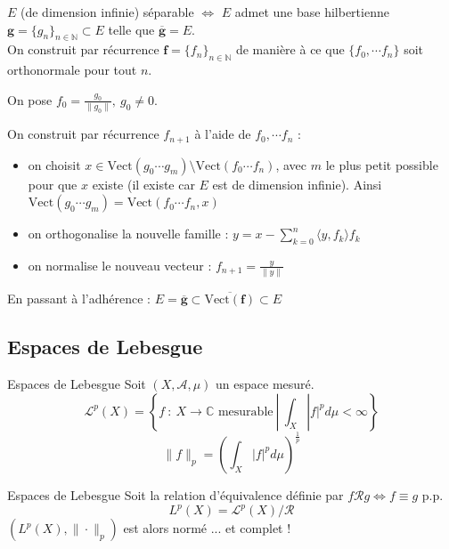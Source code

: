 \documentclass[french]{beamer}
\begin{document}
\begin{frame}{$E$ (de dimension infinie) séparable $\Longleftrightarrow$ $E$ admet une base hilbertienne}
	$\mathbf{g} = \{g_n\}_{n \in \mathbb{N}} \subset E$ telle que $\overline{\mathbf{g}} = E$.\\
	\pause
	On construit par récurrence $\mathbf{f} = \{f_n\}_{n \in \mathbb{N}}$ de manière à ce que $\{f_0, \cdots f_n\}$ soit orthonormale pour tout $n$. \\
	\pause
	
	On pose $f_0 = \frac{g_0}{\|g_0\|}, ~ g_0 \neq 0$.
	
	\pause
	On construit par récurrence $f_{n+1}$ à l'aide de $f_0, \cdots f_n$ :
	\pause
	\begin{itemize}
		\item on choisit $x \in \text{Vect} (g_0 \cdots g_m)  \setminus \text{Vect} (f_0 \cdots f_n)$, avec $m$ le plus petit possible pour que $x$ existe \pause (il existe car $E$ est de dimension infinie). \pause Ainsi $\text{Vect} (g_0 \cdots g_m) = \text{Vect} (f_0 \cdots f_n, x)$
		\pause
		\item on orthogonalise la nouvelle famille : $\displaystyle y = x - \sum_{k = 0}^{n} \langle y, f_k \rangle f_k$
		\pause
		\item on normalise le nouveau vecteur : $f_{n+1} = \frac{y}{\|y\|}$
	\end{itemize}
	
	\pause
	En passant à l'adhérence : $E = \overline{\mathbf{g}} \subset \overline{\text{Vect}(\mathbf{f})} \subset E$
\end{frame}

\subsection{Espaces de Lebesgue}

\begin{frame}{Espaces de Lebesgue}
	Soit $(X, \mathcal{A}, \mu)$ un espace mesuré.\\
	\pause
	$$\mathcal{L}^p(X) = \left\{f ~: ~ X \to \mathbb{C} \text{ mesurable} ~ | ~ \int_X |f|^p d\mu < \infty \right\}$$
	\pause
	$$\|f\|_p = \left(\displaystyle \int_X |f|^p d\mu \right)^{\frac{1}{p}}$$
\end{frame}

\begin{frame}{Espaces de Lebesgue}
		Soit la relation d'équivalence définie par $f \mathcal{R} g \Longleftrightarrow f \equiv g$ p.p.
		\pause
		$$L^p(X) = \mathcal{L}^p(X)/\mathcal{R}$$
		\pause
		$(L^p(X), \|\cdot\|_p)$ est alors normé ... \pause et complet !
\end{frame}
\end{document}
